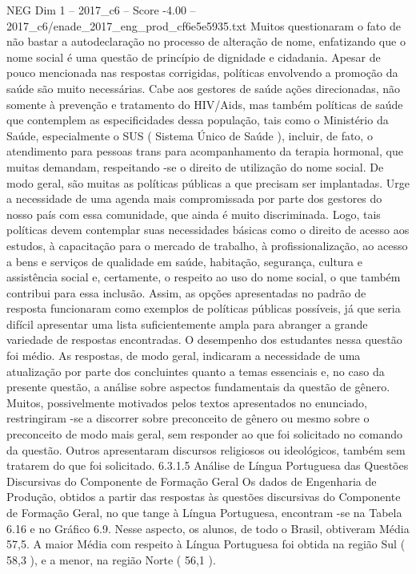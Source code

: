 \begin{textsample}{NEG Dim 1 – 2017\_c6 – Score -4.00 – 2017\_c6/enade\_2017\_eng\_prod\_cf6e5e5935.txt}
Muitos questionaram o fato de não bastar a autodeclaração no processo de alteração de nome, enfatizando que o nome social é uma questão de princípio de dignidade e cidadania.
Apesar de pouco mencionada nas respostas corrigidas, políticas envolvendo a promoção da saúde são muito necessárias.
Cabe aos gestores de saúde ações direcionadas, não somente à prevenção e tratamento do HIV/Aids, mas também políticas de saúde que contemplem as especificidades dessa população, tais como o Ministério da Saúde, especialmente o SUS ( Sistema Único de Saúde ), incluir, de fato, o atendimento para pessoas trans para acompanhamento da terapia hormonal, que muitas demandam, respeitando -se o direito de utilização do nome social.
De modo geral, são muitas as políticas públicas a que precisam ser implantadas.
Urge a necessidade de uma agenda mais compromissada por parte dos gestores do nosso país com essa comunidade, que ainda é muito discriminada.
Logo, tais políticas devem contemplar suas necessidades básicas como o direito de acesso aos estudos, à capacitação para o mercado de trabalho, à profissionalização, ao acesso a bens e serviços de qualidade em saúde, habitação, segurança, cultura e assistência social e, certamente, o respeito ao uso do nome social, o que também contribui para essa inclusão.
Assim, as opções apresentadas no padrão de resposta funcionaram como exemplos de políticas públicas possíveis, já que seria difícil apresentar uma lista suficientemente ampla para abranger a grande variedade de respostas encontradas.
O desempenho dos estudantes nessa questão foi médio.
As respostas, de modo geral, indicaram a necessidade de uma atualização por parte dos concluintes quanto a temas essenciais e, no caso da presente questão, a análise sobre aspectos fundamentais da questão de gênero.
Muitos, possivelmente motivados pelos textos apresentados no enunciado, restringiram -se a discorrer sobre preconceito de gênero ou mesmo sobre o preconceito de modo mais geral, sem responder ao que foi solicitado no comando da questão.
Outros apresentaram discursos religiosos ou ideológicos, também sem tratarem do que foi solicitado. 6.3.1.5 Análise de Língua Portuguesa das Questões Discursivas do Componente de Formação Geral Os dados de Engenharia de Produção, obtidos a partir das respostas às questões discursivas do Componente de Formação Geral, no que tange à Língua Portuguesa, encontram -se na Tabela 6.16 e no Gráfico 6.9.
Nesse aspecto, os alunos, de todo o Brasil, obtiveram Média 57,5.
A maior Média com respeito à Língua Portuguesa foi obtida na região Sul ( 58,3 ), e a menor, na região Norte ( 56,1 ).

\end{textsample}
